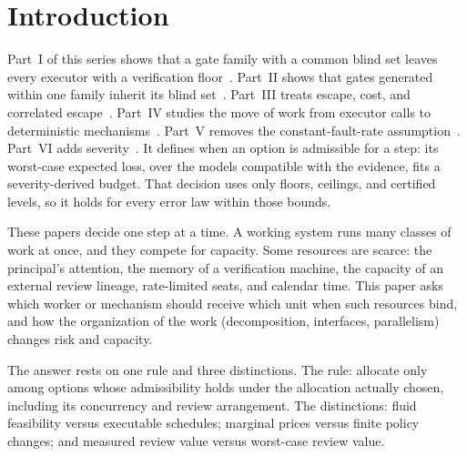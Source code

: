 \documentclass[11pt]{article}
\theoremstyle{definition}
\theoremstyle{remark}
\begin{document}
\section{Introduction}
Part~I of this series shows that a gate family with a common blind set leaves every executor with a
verification floor~\cite{p1}. Part~II shows that gates generated within one family inherit its blind
set~\cite{p2}. Part~III treats escape, cost, and correlated escape~\cite{p3}. Part~IV studies the move
of work from executor calls to deterministic mechanisms~\cite{p4}. Part~V removes the
constant-fault-rate assumption~\cite{p5}. Part~VI adds
severity~\cite{p6}. It defines when an option is admissible for a step: its worst-case expected loss,
over the models compatible with the evidence, fits a severity-derived budget. That decision uses only
floors, ceilings, and certified levels, so it holds for every error law within those bounds.

These papers decide one step at a time. A working system runs many classes of work at once, and they
compete for capacity. Some resources are scarce: the principal's attention, the memory of a
verification machine, the capacity of an external review lineage, rate-limited seats, and calendar
time. This paper asks which worker or mechanism should receive which unit when such resources bind,
and how the organization of the work (decomposition, interfaces, parallelism) changes risk and
capacity.

The answer rests on one rule and three distinctions. The rule: allocate only among options whose
admissibility holds under the allocation actually chosen, including its concurrency and review
arrangement. The distinctions: fluid feasibility versus executable schedules; marginal prices versus
finite policy changes; and measured review value versus worst-case review value.
\end{document}

